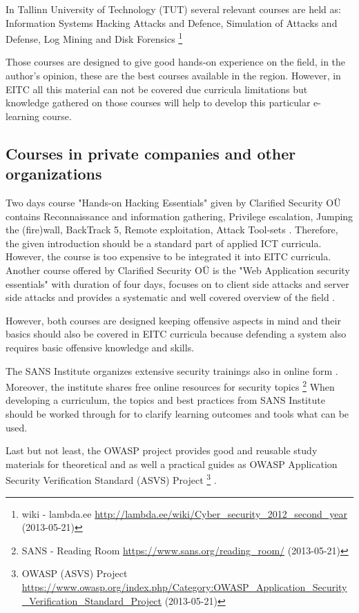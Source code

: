 In Tallinn University of Technology (\gls{TUT}) several relevant courses are held as: Information Systems Hacking Attacks and Defence, Simulation of Attacks and Defense, Log Mining and Disk Forensics \footnote{wiki - lambda.ee \url{http://lambda.ee/wiki/Cyber_security_2012_second_year} (2013-05-21)}

Those courses are designed to give good hands-on experience on the field, in the author’s opinion, these are the best courses available in the region. However, in \gls{EITC} all this material can not be covered due curricula limitations but knowledge gathered on those courses will help to develop this particular e-learning course.

\subsection{Courses in private companies and other organizations}

Two days course "Hands-on Hacking Essentials" given by Clarified Security OÜ contains Reconnaissance and information gathering, Privilege escalation, Jumping the (fire)wall, BackTrack 5, Remote exploitation, Attack Tool-sets \citep{website:clarifiedsecurity_hohe}. Therefore, the given introduction should be a standard part of applied \gls{ICT} curricula. However, the course is too expensive to be integrated it into \gls{EITC} curricula. Another course offered by Clarified Security OÜ is the "Web Application security essentials" with duration of four days, focuses on to client side attacks and server side attacks and provides a systematic and well covered overview of the field \citep{website:clarifiedsecurity_hohe}.

However, both courses are designed  keeping offensive aspects in mind and their basics should also be covered in \gls{EITC} curricula because defending a system also requires basic offensive knowledge and skills.


The SANS Institute organizes extensive security trainings also in online form \citep{website:SANS}. Moreover, the institute shares free online resources for security topics \footnote{SANS - Reading Room \url{https://www.sans.org/reading_room/} (2013-05-21)} When developing a curriculum, the topics and best practices from SANS Institute should be worked through for to clarify learning outcomes and tools what can be used.

Last but not least, the \gls{OWASP} project provides good and reusable study materials  for theoretical and as well a practical guides as \gls{OWASP} Application Security Verification Standard (\gls{ASVS}) Project \footnote{\gls{OWASP}  (\gls{ASVS}) Project \url{https://www.owasp.org/index.php/Category:OWASP_Application_Security_Verification_Standard_Project} (2013-05-21)} .

